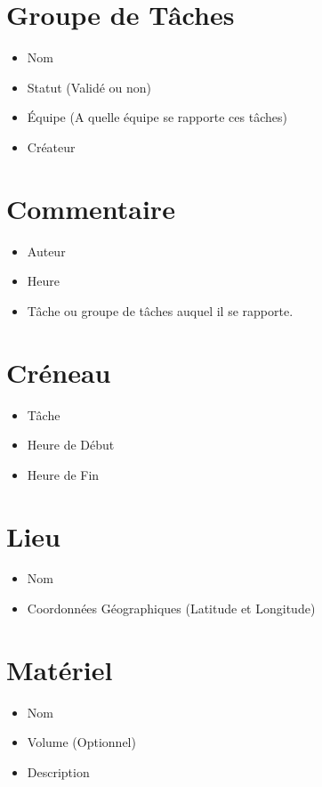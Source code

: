 \section{Groupe de Tâches}
\begin{itemize}
 \item Nom
\item Statut (Validé ou non)
\item Équipe (A quelle équipe se rapporte ces tâches)
\item Créateur

\end{itemize}

\section{Commentaire}
\begin{itemize}
 \item Auteur
\item Heure
\item Tâche ou groupe de tâches auquel il se rapporte.

\end{itemize}


\section{Créneau}
\begin{itemize}
 \item Tâche
\item Heure de Début
\item Heure de Fin

\end{itemize}

\section{Lieu}
\begin{itemize}
\item Nom
\item Coordonnées Géographiques (Latitude et Longitude)
\end{itemize}



\section{Matériel}
\begin{itemize}
\item Nom
\item Volume (Optionnel)
\item Description

\end{itemize}


